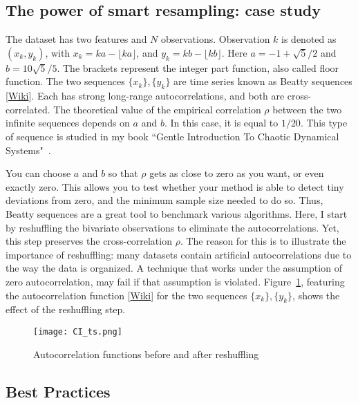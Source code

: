 \documentclass[oneside,10pt]{book}
\begin{document}
\subsection{The power of smart resampling: case study}\label{resa3oblo}

The dataset has two features and $N$ observations. Observation $k$ is denoted as
 $(x_k, y_k)$, with $x_k = ka - \lfloor ka\rfloor$, and $y_k = kb - \lfloor kb \rfloor$. Here $a =-1 +\sqrt{5}/2$  and $b = 10\sqrt{5}/5$.
 The brackets represent the integer part function, also called floor function. The two sequences $\{x_k\}, \{y_k\}$ are
 time series known as \textcolor{index}{Beatty sequences} [\href{https://en.wikipedia.org/wiki/Beatty_sequence}{Wiki}]. 
Each has strong long-range autocorrelations, and both are cross-correlated. The theoretical value of the empirical correlation $\rho$ between the two infinite sequences depends on $a$ and $b$. In this case, it is equal to $1/20$. This type of sequence is studied in my book
 ``Gentle Introduction To Chaotic Dynamical Systems"~\cite{vgchaos}.

You can choose $a$ and $b$ so that $\rho$ gets as close to zero as you want, or even exactly zero. This allows you to test
  whether your method is able to detect tiny deviations from zero, and the minimum sample size needed to do so. Thus, Beatty sequences are a great tool to benchmark various algorithms. Here, I start by reshuffling the bivariate observations to eliminate 
 the autocorrelations. Yet, this step preserves the cross-correlation $\rho$. The reason for this is to illustrate the importance of reshuffling: many datasets contain artificial autocorrelations due to the way the data is organized. A technique that works 
 under the assumption of zero autocorrelation, may fail if that assumption is violated. Figure~\ref{fig:not6resd8},
 featuring the \textcolor{index}{autocorrelation function} [\href{https://en.wikipedia.org/wiki/Autocorrelation}{Wiki}] for the two sequences $\{x_k\}, \{y_k\}$, 
 shows the effect of the reshuffling step. 

\begin{figure}[H]
\centering
\texttt{[image: CI\_ts.png]} %
\caption{Autocorrelation functions before and after reshuffling}
\label{fig:not6resd8}
\end{figure}

\subsection{Best Practices}
\end{document}

